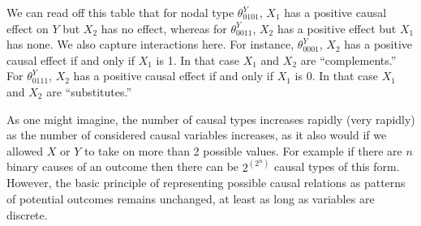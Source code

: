 \documentclass[
  12pt,
]{book}
\begin{document}
We can read off this table that for nodal type \(\theta^Y_{0101}\), \(X_1\) has a positive causal effect on \(Y\) but \(X_2\) has no effect, whereas for \(\theta^Y_{0011}\), \(X_2\) has a positive effect but \(X_1\) has none. We also capture interactions here. For instance, \(\theta^Y_{0001}\), \(X_2\) has a positive causal effect if and only if \(X_1\) is 1. In that case \(X_1\) and \(X_2\) are ``complements.'' For \(\theta^Y_{0111}\), \(X_2\) has a positive causal effect if and only if \(X_1\) is 0. In that case \(X_1\) and \(X_2\) are ``substitutes.''

As one might imagine, the number of causal types increases rapidly (very rapidly) as the number of considered causal variables increases, as it also would if we allowed \(X\) or \(Y\) to take on more than 2 possible values. For example if there are \(n\) binary causes of an outcome then there can be \(2^{\left(2^n\right)}\) causal types of this form. However, the basic principle of representing possible causal relations as patterns of potential outcomes remains unchanged, at least as long as variables are discrete.
\end{document}
